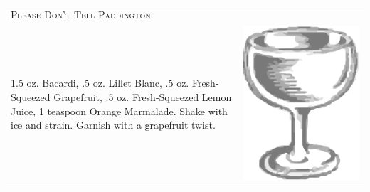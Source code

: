 \documentclass{article}
\begin{document}
\begin{multicols}{2}
\begin{tabular}{p{2in} p{0.5in}}
\multicolumn{2}{p{3in}}{\centering\Huge\textsc{Please Don't Tell Paddington}} \\ 
  \vspace{-0.1in}1.5 oz. Bacardi, .5 oz. Lillet Blanc, .5 oz. Fresh-Squeezed Grapefruit, .5 oz. Fresh-Squeezed Lemon Juice, 1 teaspoon Orange Marmalade. Shake with ice and strain. Garnish with a grapefruit twist. &
  \vspace{-0.1in} \includegraphics{coupe.png}
\end{tabular}


\end{multicols}
\end{document}
